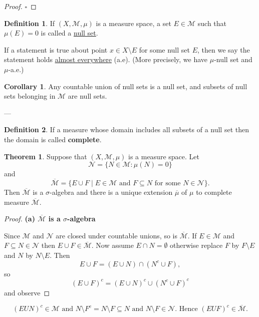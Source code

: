 \documentclass[11pt]{article}
\theoremstyle{definition}
\newtheorem{definition}{Definition}[section]
\newtheorem{theorem}{Theorem}[section]
\newtheorem{corollary}{Corollary}[section]
\theoremstyle{remark}
\begin{document}
\begin{proof}
$\square$
\end{proof}

\begin{definition}\label{def:null_set}
If $(X, \mathcal{M}, \mu)$ is a measure space, a set $E \in \mathcal{M}$ such that $\mu(E) = 0$ is called a \underline{null set}.

If a statement is true about point $x \in X \setminus E$ for some null set $E$, then we say the statement holds \underline{almost everywhere} (a.e). (More precisely, we have $\mu$-null set and $\mu$-a.e.)
\end{definition}

\begin{corollary}\label{cor:null_set_union}
Any countable union of null sets is a null set, and subsets of null sets belonging in $\mathcal{M}$ are null sets.
\end{corollary}
---

\begin{definition}\label{def:complete_measure_domain}
If a measure whose domain includes all subsets of a null set then the domain is called \textbf{complete}.
\end{definition}

\begin{theorem}\label{thm:measure_extension}
Suppose that $(X, \mathcal{M}, \mu)$ is a measure space. Let
\[
\mathcal{N} = \{N \in \mathcal{M} : \mu(N) = 0\}
\]
and
\[
\overline{\mathcal{M}} = \{E \cup F \mid E \in \mathcal{M} \text{ and } F \subseteq N \text{ for some } N \in \mathcal{N}\}.
\]
Then $\overline{\mathcal{M}}$ is a $\sigma$-algebra and there is a unique extension $\overline{\mu}$ of $\mu$ to complete measure $\overline{\mathcal{M}}$.
\end{theorem}

\begin{proof}
\textbf{(a) $\overline{\mathcal{M}}$ is a $\sigma$-algebra}

Since $\mathcal{M}$ and $\mathcal{N}$ are closed under countable unions, so is $\overline{\mathcal{M}}$. If $E \in \mathcal{M}$ and $F \subseteq N \in \mathcal{N}$ then $E \cup F \in \overline{\mathcal{M}}$. Now assume $E \cap N = \emptyset$ otherwise replace $F$ by $F \setminus E$ and $N$ by $N \setminus E$. Then
\[
E \cup F = (E \cup N) \cap (N^c \cup F),
\]
so
\[
(E \cup F)^c = (E \cup N)^c \cup (N^c \cup F)^c
\]
and observe
\end{proof}

\[
(EUN)^c \in \mathcal{M} \text{ and } N \setminus F^c = N \setminus F \subseteq N \text{ and } N \setminus F \in \mathcal{N}.
\text{ Hence } (EUF)^c \in \overline{\mathcal{M}}.
\]
\end{document}
